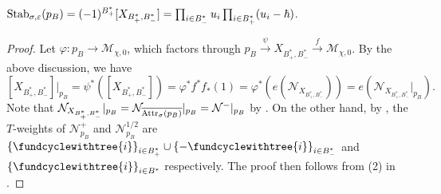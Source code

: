 \documentclass[b5paper]{article}
\newcommand{\NN}{\mathcal{N}}
\newcommand{\MM}{\mathcal{M}}
\newcommand{\Stab}{\textnormal{Stab}_{\sigma,\varepsilon}}
\newcommand{\Attr}{\textnormal{Attr}_\sigma}
\begin{document}
\begin{proposition}[pps:]{}
    $\Stab(p_B)=(-1)^{B^*_+}[X_{B^*_+,B^*_-}]=\prod_{i\in B^*_-}^{}u_i\prod_{i\in B^*_+}^{}(u_i-\hbar)$.
    \begin{proof}
        Let $\varphi:p_B\rightarrow \MM_{\chi,0}$, which factors through $p_B\xrightarrow[]{\psi}X_{B^*_+,B^*_-}\xrightarrow[]{f}\MM_{\chi,0}$. By the above discussion, we have
        \[
            [X_{B^*_+,B^*_-}]|_{p_B}=
        \psi^*([X_{B^*_+,B^*_-}])=\varphi^*f^*f_*(1)=\varphi^*(e(\mathcal{N}_{X_{B^*_+,B^*_-}}))=e(\mathcal{N}_{X_{B^*_+,B^*_-}}|_{p_B}).
        \]
        Note that $\mathcal{N}_{X_{B^*_+,B^*_-}}|_{p_B}=\mathcal{N}_{\overline{\Attr(p_B)}}|_{p_B}=\mathcal{N}^-|_{p_B}$ by .
        On the other hand,
        by , the $T$-weights of $\NN^+_{p_B}$ and $\NN^{1/2}_{p_B}$ are $\CB{\fundcyclewithtree{i}}_{i\in B^*_+}\cup \CB{-\fundcyclewithtree{i}}_{i\in B^*_-}$ and $\CB{\fundcyclewithtree{i}}_{i\in B^*}$ respectively.
        The proof then follows from (2) in .
    \end{proof}
\end{proposition}


\appendix




\end{document}
